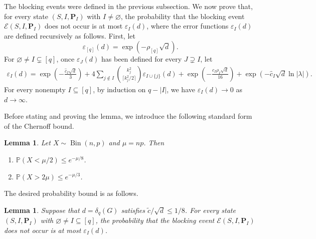 \documentclass[12pt]{article}
\numberwithin{equation}{section}
\newtheorem{lemma}[theorem]{Lemma}
\theoremstyle{definition}
\newcommand{\Prob}{\mathbb{P}}
\newcommand{\Bin}{\operatorname{Bin}}
\begin{document}
The blocking events were defined in the previous subsection. We now prove that,
for every state $(S,I,\mathbf{P}_I)$ with $I \ne \varnothing$, the probability
that the blocking event $\mathcal{E}(S,I,\mathbf{P}_I)$ does not occur is at most
$\varepsilon_I(d)$, where the error functions $\varepsilon_I(d)$ are defined
recursively as follows. First, let
\[
 \varepsilon_{[q]}(d) = \exp(-\rho_{[q]}\sqrt{d}).
\]
For $\varnothing \ne I \subsetneq [q]$, once $\varepsilon_J(d)$ has been
defined for every $J \supsetneq I$, let
\begin{align*}
 \varepsilon_I(d)
=  \exp\left(-\frac{\hat{c}_{I}\sqrt{d}}{3}\right)
 +4\sum_{j \notin I}
 \binom{k_j^2}{\lceil k_j^2/2\rceil}
 \varepsilon_{I \cup \{j\}}(d) 
 +\exp\left(-\frac{c_I\rho_I\sqrt{d}}{16}\right)
 +\exp\left(-\hat{c}_{I}\sqrt{d}\ln |\lambda|\right).
\end{align*}
For every nonempty $I \subseteq [q]$, by induction on $q - |I|$, we have
$\varepsilon_I(d) \to 0$ as $d \to \infty$.

Before stating and proving the lemma, we introduce the following standard form of the Chernoff bound.

\begin{lemma}\label{lem:chernoff}
	Let $X \sim \Bin(n,p)$ and $\mu=np$. Then 
	\begin{enumerate}[label=(\arabic*),ref=(\arabic*)]
		\item\label{item:chernoff-lower}
		$\Prob(X < \mu/2) \leq e^{-\mu/8}$.
		\item\label{item:chernoff-upper}
		$\Prob(X > 2\mu) \leq e^{-\mu/3}$.
	\end{enumerate}
\end{lemma}

The desired probability bound is as follows.

\begin{lemma}
\label{lem:local-blocking}
Suppose that $d = \delta_q(G)$ satisfies $\widetilde{c}/\sqrt{d} \leq 1/8$.
For every state $(S,I,\mathbf{P}_I)$ with $\varnothing \ne I \subseteq [q]$, the probability
that the blocking event $\mathcal{E}(S,I,\mathbf{P}_I)$ does not occur is at most
$\varepsilon_I(d)$.
\end{lemma}
\end{document}
